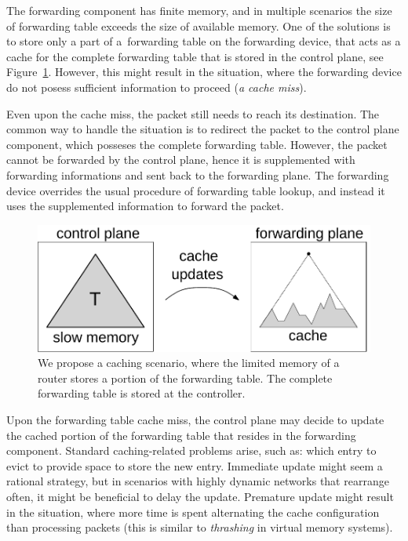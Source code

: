 The forwarding component has finite memory, and in multiple scenarios the size of forwarding table exceeds the size of available memory.
One of the solutions is to store only a part of a~forwarding table on the forwarding device, that acts as a cache for the complete forwarding table that is stored in the control plane, see Figure~\ref{fig:router}.
However, this might result in the situation, where the forwarding device do not posess sufficient information to proceed (\emph{a cache miss}).

Even upon the cache miss, the packet still needs to reach its destination.
The common way to handle the situation is to redirect the packet to the control plane component, which posseses the complete forwarding table.
However, the packet cannot be forwarded by the control plane, hence it is supplemented with forwarding informations and sent back to the forwarding plane.
The forwarding device overrides the usual procedure of forwarding table lookup, and instead it uses the supplemented information to forward the packet.


\begin{figure}[t]
\centering
\includegraphics[width=0.59\columnwidth]{figs/router5.pdf}
\caption{We propose a caching scenario, where the limited memory of a router stores a portion of the forwarding table. The complete forwarding table is stored at the controller.}\label{fig:router}
\vspace{-1em}
\end{figure}




Upon the forwarding table cache miss, the control plane may decide to update the cached portion of the forwarding table that resides in the forwarding component.
Standard caching-related problems arise, such as: which entry to evict to provide space to store the new entry.
Immediate update might seem a rational strategy, but in scenarios with highly dynamic networks that rearrange often, it might be beneficial to delay the update.
Premature update might result in the situation, where more time is spent alternating the cache configuration than processing packets (this is similar to \emph{thrashing} in virtual memory systems).

